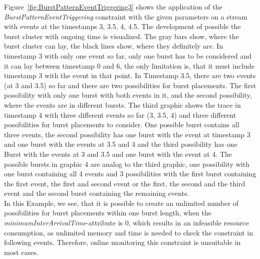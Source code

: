 Figure~\ref{fig:BurstPatternEventTriggering3} shows the application of the \emph{BurstPatternEventTriggering} constraint with the given parameters on a stream with events at the timestamps 3, 3.5, 4, 4.5. The development of possible the burst cluster with ongoing time is visualized. The gray bars show, where the burst cluster can lay, the black lines show, where they definitely are. In timestamp 3 with only one event so far, only one burst has to be considered and it can lay between timestamp 0 and 6, the only limitation is, that it must include timestamp 3 with the event in that point. In Timestamp 3.5, there are two events (at 3 and 3.5) so far and there are two possibilities for burst placements. The first possibility with only one burst with both events in it, and the second possibility, where the events are in different bursts. The third graphic shows the trace in timestamp 4 with three different events so far (3, 3.5, 4) and three different possibilities for burst placements to consider. One possible burst contains all three events, the second possibility has one burst with the event at timestamp 3 and one burst with the events at 3.5 and 4 and the third possibility has one Burst with the events at 3 and 3.5 and one burst with the event at 4. The possible bursts in graphic 4 are analog to the third graphic, one possibility with one burst containing all 4 events and 3 possibilities with the first burst containing the first event, the first and second event or the first, the second and the third event and the second burst containing the remaining events.\\
In this Example, we see, that it is possible to create an unlimited number of possibilities for burst placements within one burst length, when the \textit{minimumInterArrivalTime}-attribute is 0, which results in an infeasible resource consumption, as unlimited memory and time is needed to check the constraint in following events. Therefore, online monitoring this constraint is unsuitable in most cases.

